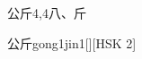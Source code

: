 \begin{entry}{公斤}{4,4}{⼋、⽄}
  \begin{phonetics}{公斤}{gong1jin1}[][HSK 2]
  \end{phonetics}
\end{entry}
